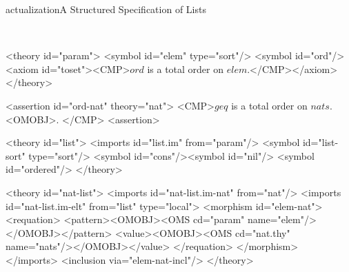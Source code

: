 \begin{myfig}{actualization}{A Structured Specification of Lists}
\begin{center}
\\[1ex]\baselineskip=8pt\scriptsize
\begin{boxedverbatim}
<theory id="param">                   
 <symbol id="elem" type="sort"/>       
 <symbol id="ord"/>
 <axiom id="toset"><CMP>\(ord\) is a  total order on \(elem\).</CMP></axiom>
</theory>                               
                                       
<assertion id="ord-nat" theory="nat"> 
 <CMP>\(geq\) is a total order on \(nats\).<OMOBJ>.
 </CMP>
<assertion>

<theory id="list">
 <imports id="list.im" from="param"/>
 <symbol id="list-sort" type="sort"/>
 <symbol id="cons"/><symbol id="nil"/>
 <symbol id="ordered"/>
</theory>

<theory id="nat-list">
 <imports id="nat-list.im-nat" from="nat"/>
 <imports id="nat-list.im-elt" from="list" type="local">
  <morphism id="elem-nat">
   <requation>
    <pattern><OMOBJ><OMS cd="param" name="elem"/></OMOBJ></pattern>
    <value><OMOBJ><OMS cd="nat.thy" name="nats"/></OMOBJ></value>
   </requation>
  </morphism>
 </imports>
 <inclusion via="elem-nat-incl"/>
</theory>


\end{boxedverbatim}
\end{center}
\end{myfig}
